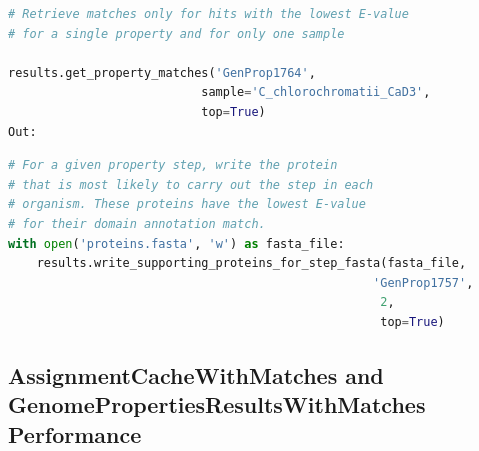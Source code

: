 \FloatBarrier
\begin{lstlisting}[language=Python]  
# Retrieve matches only for hits with the lowest E-value 
# for a single property and for only one sample                                  
   
results.get_property_matches('GenProp1764', 
                           sample='C_chlorochromatii_CaD3',
                           top=True)
Out:
\end{lstlisting}

\begin{table}[!ht]
\centering
{}
\end{table}

\FloatBarrier
\begin{lstlisting}[language=Python]  
# For a given property step, write the protein 
# that is most likely to carry out the step in each 
# organism. These proteins have the lowest E-value
# for their domain annotation match.                                 
with open('proteins.fasta', 'w') as fasta_file:
    results.write_supporting_proteins_for_step_fasta(fasta_file, 
                                                   'GenProp1757', 
                                                    2, 
                                                    top=True)
\end{lstlisting}

\subsection{AssignmentCacheWithMatches and GenomePropertiesResultsWithMatches 
Performance} \label{matches-performance}

